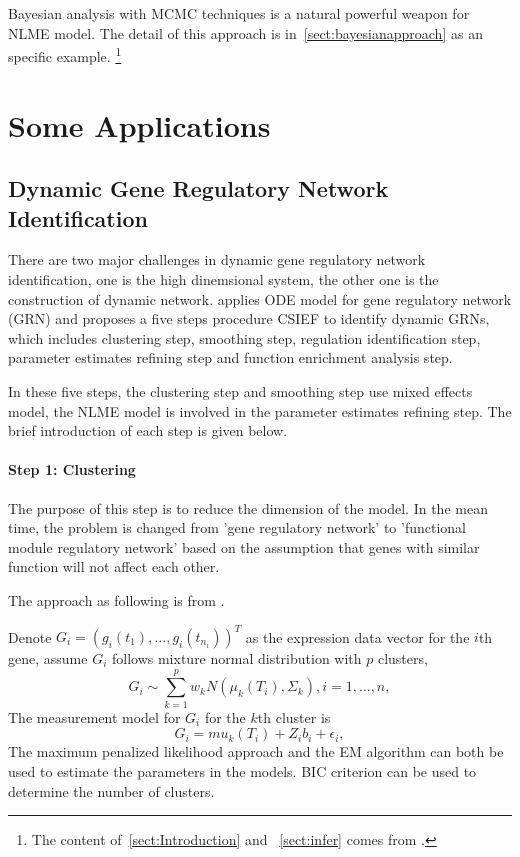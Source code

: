 \documentclass[12pt]{extarticle}
\begin{document}
Bayesian analysis with MCMC techniques is a natural powerful weapon for NLME model. The detail of this approach is in~\ref{sect:bayesianapproach} as an specific example.  \footnote{The content of~\ref{sect:Introduction} and ~\ref{sect:infer} comes from \cite{Davidian03}.}

\section{Some Applications}
\label{sect:application}

\subsection{Dynamic Gene Regulatory Network Identification}
\label{sect:network}
There are two major challenges in dynamic gene regulatory network identification, one is the high dinemsional system, the other one is the construction of dynamic network. \cite{Lu11}  applies ODE model for gene regulatory network (GRN) and proposes a five steps procedure CSIEF to identify dynamic GRNs, which includes clustering step, smoothing step, regulation identification step, parameter estimates refining step and function enrichment analysis step.

In these five steps, the clustering step and smoothing step use mixed effects model, the NLME model is involved in the parameter estimates refining step. The brief introduction of each step is given below.

\paragraph{Step 1: Clustering}
The purpose of this step is to reduce the dimension of the model. In the mean time, the problem is changed from 'gene regulatory network' to 'functional module regulatory network' based on the assumption that genes with similar function will not affect each other.

The approach as following is from  \cite{Ma08}.

Denote $G_i={(g_{i}(t_{1}),\ldots,g_{i}(t_{n_i}))}^T$ as the expression data vector for the $i$th gene, assume $G_i$ follows mixture normal distribution with $p$ clusters,
\begin{equation}
G_{i}\sim{}\sum_{k=1}^{p}w_{k}N(\mu_{k}(T_{i}),\Sigma_{k}), i=1,\ldots,n,
\end{equation}
The measurement model for $G_i$ for the $k$th cluster is
\begin{equation}
G_i=mu_{k}(T_{i})+Z_{i}b_{i}+\epsilon_{i},
\end{equation}
The maximum penalized likelihood approach and the EM algorithm can both be used to estimate the parameters in the models. BIC criterion can be used to determine the number of clusters.
\end{document}
